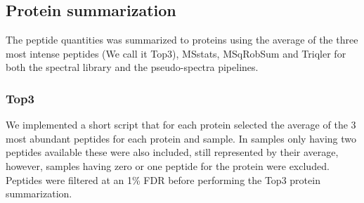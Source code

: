 \documentclass[10pt,letterpaper]{article}
\begin{document}
 




\subsection*{Protein summarization}

The peptide quantities was summarized to proteins using the average of the three most intense peptides (We call it Top3), MSstats, MSqRobSum and Triqler for both the spectral library and the pseudo-spectra pipelines. 

\subsubsection*{Top3}

We implemented a short script that for each protein selected the average of the 3 most abundant peptides for each protein and sample. In samples only having two peptides available these were also included, still represented by their average, however, samples having zero or one peptide for the protein were excluded. Peptides were filtered at an 1\% FDR before performing the Top3 protein summarization. 
\end{document}
